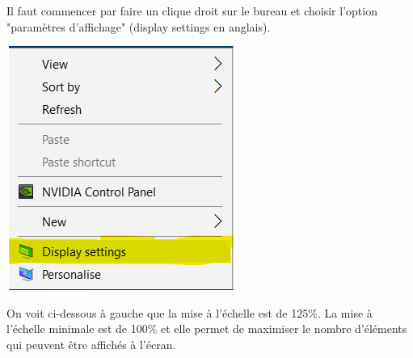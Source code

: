 Il faut commencer par faire un clique droit sur le bureau et choisir l'option "paramètres d'affichage" (display settings en anglais).
\begin{center}
    \includegraphics[scale=1]{images/windows_scaling_1.png}
\end{center}
    
On voit ci-dessous à gauche que la mise à l'échelle est de 125\%. La mise à l'échelle minimale est de 100\% et elle permet de maximiser le nombre d'éléments qui peuvent être affichés à l'écran.\\

